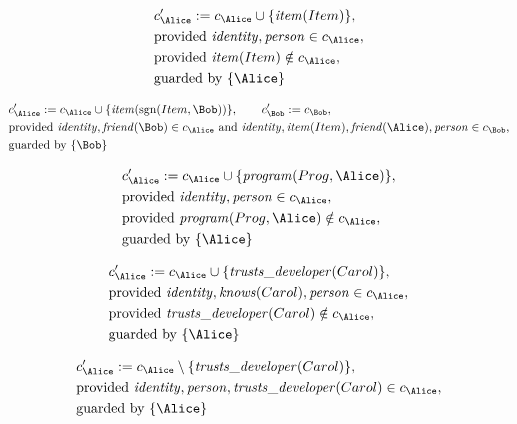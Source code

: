 \begin{align*}
&
c'_
{
\Alice
}
 := 
c_
{
\Alice
}
 \cup 
\{
\mathit{\detokenize{
item
}}
(
Item
)
\}
,\\
&
\text{provided } 
\mathit{\detokenize{
identity
}}
,
\mathit{\detokenize{
person
}}
 \in c_
{
\Alice
}
,\\
&
\text{provided } 
\mathit{\detokenize{
item
}}
(
Item
)
 \notin c_
{
\Alice
}
,\\
&
\text{guarded by } \{
\Alice
\}
\end{align*}

\begin{align*}
&
c'_
{
\Alice
}
 := 
c_
{
\Alice
}
 \cup 
\{
\mathit{\detokenize{
item
}}
(
\mathrm{sgn}(
Item
,
\Bob
)
)
\}
, \qquad 
c'_
{
\Bob
}
 := 
c_
{
\Bob
}
,\\
&
\text{provided } 
\mathit{\detokenize{
identity
}}
,
\mathit{\detokenize{
friend
}}
(
\Bob
)
 \in c_
{
\Alice
}
 \text{ and } 
\mathit{\detokenize{
identity
}}
,
\mathit{\detokenize{
item
}}
(
Item
)
,
\mathit{\detokenize{
friend
}}
(
\Alice
)
,
\mathit{\detokenize{
person
}}
 \in c_
{
\Bob
}
,\\
&
\text{guarded by } \{
\Bob
\}
\end{align*}

\begin{align*}
&
c'_
{
\Alice
}
 := 
c_
{
\Alice
}
 \cup 
\{
\mathit{\detokenize{
program
}}
(
Prog
,
\Alice
)
\}
,\\
&
\text{provided } 
\mathit{\detokenize{
identity
}}
,
\mathit{\detokenize{
person
}}
 \in c_
{
\Alice
}
,\\
&
\text{provided } 
\mathit{\detokenize{
program
}}
(
Prog
,
\Alice
)
 \notin c_
{
\Alice
}
,\\
&
\text{guarded by } \{
\Alice
\}
\end{align*}

\begin{align*}
&
c'_
{
\Alice
}
 := 
c_
{
\Alice
}
 \cup 
\{
\mathit{\detokenize{
trusts_developer
}}
(
Carol
)
\}
,\\
&
\text{provided } 
\mathit{\detokenize{
identity
}}
,
\mathit{\detokenize{
knows
}}
(
Carol
)
,
\mathit{\detokenize{
person
}}
 \in c_
{
\Alice
}
,\\
&
\text{provided } 
\mathit{\detokenize{
trusts_developer
}}
(
Carol
)
 \notin c_
{
\Alice
}
,\\
&
\text{guarded by } \{
\Alice
\}
\end{align*}

\begin{align*}
&
c'_
{
\Alice
}
 := 
c_
{
\Alice
}
 \setminus 
\{
\mathit{\detokenize{
trusts_developer
}}
(
Carol
)
\}
,\\
&
\text{provided } 
\mathit{\detokenize{
identity
}}
,
\mathit{\detokenize{
person
}}
,
\mathit{\detokenize{
trusts_developer
}}
(
Carol
)
 \in c_
{
\Alice
}
,\\
&
\text{guarded by } \{
\Alice
\}
\end{align*}
